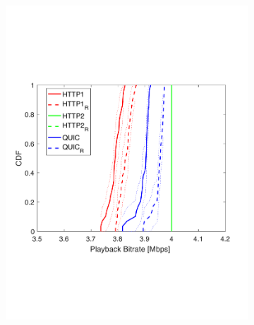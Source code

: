 \begin{figure}[htb!]
\centering
\begin{subfigure}[t]{0.33\textwidth}
   \captionsetup{justification=centering,margin=4.5cm}
    \includegraphics[trim={0 5cm 0 7cm}, scale=0.24]{figures/CDF_bitrat_squad_udpw9_nd18.pdf}
     \caption{}
    \label{fig:udpw9bitrate}
  \end{subfigure}
  \begin{subfigure}[t]{0.33\textwidth}
  \captionsetup{justification=raggedright,singlelinecheck=false,margin=2.5cm}

\end{subfigure}
\end{figure}

